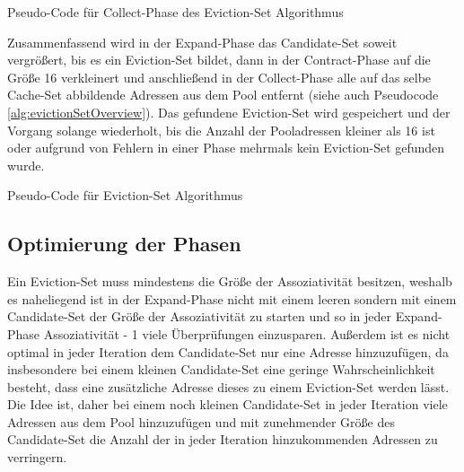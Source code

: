 \begin{algorithm}[h]
\DontPrintSemicolon
\caption{Pseudo-Code für Collect-Phase des Eviction-Set Algorithmus}
\label{alg:evictionSetCollect}

\end{algorithm}

Zusammenfassend wird in der Expand-Phase das Candidate-Set soweit vergrößert, bis es ein Eviction-Set bildet, dann in der Contract-Phase auf die Größe 16 verkleinert und anschließend in der Collect-Phase alle auf das selbe Cache-Set abbildende Adressen aus dem Pool entfernt (siehe auch Pseudocode \ref{alg:evictionSetOverview}).
Das gefundene Eviction-Set wird gespeichert und der Vorgang solange wiederholt, bis die Anzahl der Pooladressen kleiner als 16 ist oder aufgrund von Fehlern in einer Phase mehrmals kein Eviction-Set gefunden wurde.

\begin{algorithm}[h]
\DontPrintSemicolon
\caption{Pseudo-Code für Eviction-Set Algorithmus}
\label{alg:evictionSetOverview}

\end{algorithm}

\subsection{Optimierung der Phasen}

Ein Eviction-Set muss mindestens die Größe der Assoziativität besitzen, weshalb es naheliegend ist in der Expand-Phase nicht mit einem leeren sondern mit einem Candidate-Set der Größe der Assoziativität zu starten und so in jeder Expand-Phase Assoziativität - 1 viele Überprüfungen einzusparen.
Außerdem ist es nicht optimal in jeder Iteration dem Candidate-Set nur eine Adresse hinzuzufügen, da insbesondere bei einem kleinen Candidate-Set eine geringe Wahrscheinlichkeit besteht, dass eine zusätzliche Adresse dieses zu einem Eviction-Set werden lässt.
Die Idee ist, daher bei einem noch kleinen Candidate-Set in jeder Iteration viele Adressen aus dem Pool hinzuzufügen und mit zunehmender Größe des Candidate-Set die Anzahl der in jeder Iteration hinzukommenden Adressen zu verringern.


